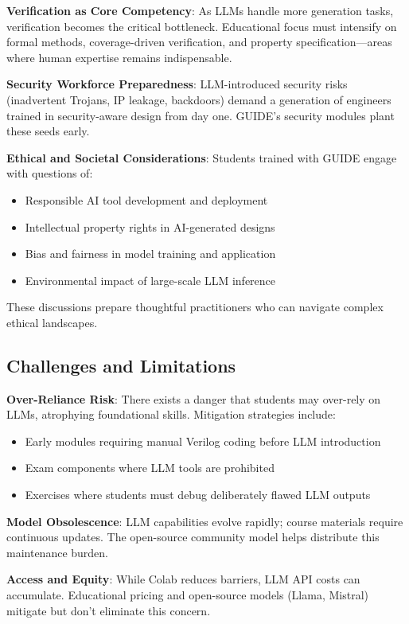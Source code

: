 \documentclass[10pt,conference]{IEEEtran}
\begin{document}
\textbf{Verification as Core Competency}: As LLMs handle more generation tasks, verification becomes the critical bottleneck. Educational focus must intensify on formal methods, coverage-driven verification, and property specification—areas where human expertise remains indispensable.

\textbf{Security Workforce Preparedness}: LLM-introduced security risks (inadvertent Trojans, IP leakage, backdoors) demand a generation of engineers trained in security-aware design from day one. GUIDE's security modules plant these seeds early.

\textbf{Ethical and Societal Considerations}: Students trained with GUIDE engage with questions of:
\begin{itemize}
    \item Responsible AI tool development and deployment
    \item Intellectual property rights in AI-generated designs
    \item Bias and fairness in model training and application
    \item Environmental impact of large-scale LLM inference
\end{itemize}

These discussions prepare thoughtful practitioners who can navigate complex ethical landscapes.

\subsection{Challenges and Limitations}

\textbf{Over-Reliance Risk}: There exists a danger that students may over-rely on LLMs, atrophying foundational skills. Mitigation strategies include:
\begin{itemize}
    \item Early modules requiring manual Verilog coding before LLM introduction
    \item Exam components where LLM tools are prohibited
    \item Exercises where students must debug deliberately flawed LLM outputs
\end{itemize}

\textbf{Model Obsolescence}: LLM capabilities evolve rapidly; course materials require continuous updates. The open-source community model helps distribute this maintenance burden.

\textbf{Access and Equity}: While Colab reduces barriers, LLM API costs can accumulate. Educational pricing and open-source models (Llama, Mistral) mitigate but don't eliminate this concern.
\end{document}
